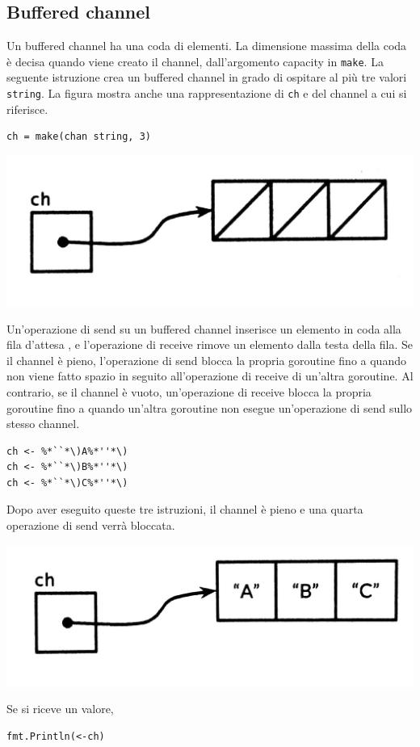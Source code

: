\subsection{Buffered channel}
\label{subsec:buffered_channel}%
Un buffered channel ha una coda di elementi.
La dimensione massima della coda è decisa quando viene creato il channel, dall'argomento capacity in \verb|make|.
La seguente istruzione crea un buffered channel in grado di ospitare al più tre valori \verb|string|.
La figura mostra anche una rappresentazione di \verb|ch| e del channel a cui si riferisce.
\begin{lstlisting}[frame=single, label={lst:lstlisting7-4-4.1}]
ch = make(chan string, 3)
\end{lstlisting}
\begin{center}
    \includegraphics[width=0.5\linewidth]{figures/figure7.2}
\end{center}
Un'operazione di send su un buffered channel inserisce un elemento in coda alla fila d'attesa , e l'operazione di receive rimove un elemento dalla testa della fila.
Se il channel è pieno, l'operazione di send blocca la propria goroutine fino a quando non viene fatto spazio in seguito all'operazione di receive di un'altra goroutine.
Al contrario, se il channel è vuoto, un'operazione di receive blocca la propria goroutine fino a quando un'altra goroutine non esegue un'operazione di send sullo stesso channel.
\begin{lstlisting}[frame=single, label={lst:lstlisting7-4-4.2}]
ch <- %*``*\)A%*''*\)
ch <- %*``*\)B%*''*\)
ch <- %*``*\)C%*''*\)
\end{lstlisting}
Dopo aver eseguito queste tre istruzioni, il channel è pieno e una quarta operazione di send verrà bloccata.
\begin{center}
    \includegraphics[width=0.5\linewidth]{figures/figure7.3}
\end{center}
Se si riceve un valore,
\begin{lstlisting}[frame=single, label={lst:lstlisting7-4-4.3}]
fmt.Println(<-ch)
\end{lstlisting}
